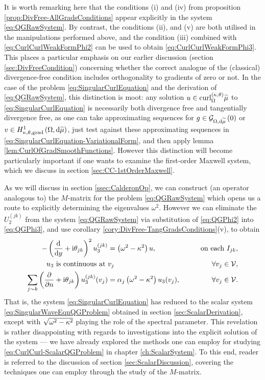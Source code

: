 It is worth remarking here that the conditions (i) and (iv) from proposition \ref{prop:DivFree-AllGradsConditions} appear explicitly in the system \eqref{eq:QGRawSystem}.
By contrast, the conditions (ii), and (v) are both utilised in the manipulations performed above, and the condition (iii) combined with \eqref{eq:CurlCurlWeakFormPhi2} can be used to obtain \eqref{eq:CurlCurlWeakFormPhi3}.
This places a particular emphasis on our earlier discussion (section \ref{sec:DivFreeCondition}) concerning whether the correct analogue of the (classical) divergence-free condition includes orthogonality to gradients of zero or not.
In the case of the problem \eqref{eq:SingularCurlEquation} and the derivation of \eqref{eq:QGRawSystem}, this distinction is moot: any solution $u\in\mathrm{curl}_{\Omega}^{\left( \kappa, \theta \right)}{\widetilde{\mu}}$ to \eqref{eq:SingularCurlEquation} is necessarily both divergence free and tangentially divergence free, as one can take approximating sequences for $g\in\mathcal{G}_{ \Omega, \mathrm{d}\widetilde{\mu}}\left( 0 \right)$ or $v\in H^1_{\kappa,\theta,\mathrm{grad}}\left( \Omega, \mathrm{d}\widetilde{\mu} \right)$, just test against these approximating sequences in \eqref{eq:SingularCurlEquation-VariationalForm}, and then apply lemma \ref{lem:CurlOfGradSmoothFunctions}.
However this distinction will become particularly important if one wants to examine the first-order Maxwell system, which we discuss in section \ref{sec:CC-1stOrderMaxwell}.

As we will discuss in section \ref{ssec:CalderonOp}, we can construct (an operator analogous to) the $M$-matrix for the problem \eqref{eq:QGRawSystem} which opens us a route to explicitly determining the eigenvalues $\omega^2$.
However we can eliminate the $U_2^{(jk)}$ from the system \eqref{eq:QGRawSystem} via substitution of \eqref{eq:QGPhi2} into \eqref{eq:QGPhi3}, and use corollary \ref{cory:DivFree-TangGradsConditions}(v), to obtain
\begin{subequations} \label{eq:CurlCurl-ScalarQGProblem}
	\begin{align}
		-\left(  \dfrac{\mathrm{d}}{\mathrm{d}y} + \mathrm{i}\theta_{jk}  \right)^2 u_3^{(jk)} &= \left( \omega^2-\kappa^2 \right)u,
		\qquad &\text{on each } I_{jk}, \\
		u_3 \text{ is continuous at } & v_j \qquad &\forall v_j\in\mathcal{V}, \\
		\sum_{j\sim k}\left( \dfrac{\partial }{\partial n}+\mathrm{i}\theta_{jk} \right)u_3^{(jk)}(v_j) &= \alpha_j\left( \omega^2-\kappa^2 \right)u_3(v_j), \qquad &\forall v_j\in\mathcal{V}.
	\end{align}
\end{subequations}
That is, the system \eqref{eq:SingularCurlEquation} has reduced to the scalar system \eqref{eq:SingularWaveEqnQGProblem} obtained in section \ref{sec:ScalarDerivation}, except with $\sqrt{\omega^2-\kappa^2}$ playing the role of the spectral parameter.
This revelation is rather disappointing with regards to investigations into the explicit solution of the system --- we have already explored the methods one can employ for studying \eqref{eq:CurlCurl-ScalarQGProblem} in chapter \ref{ch:ScalarSystem}.
To this end, reader is referred to the discussion of section \ref{sec:ScalarDiscussion}, covering the techniques one can employ through the study of the $M$-matrix.

